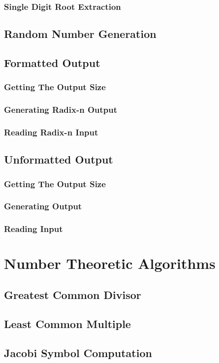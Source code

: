 \documentclass[b5paper]{book}
\begin{document}
\subsection{Single Digit Root Extraction}
\section{Random Number Generation}
\section{Formatted Output}
\subsection{Getting The Output Size}
\subsection{Generating Radix-n Output}
\subsection{Reading Radix-n Input}
\section{Unformatted Output}
\subsection{Getting The Output Size}
\subsection{Generating Output}
\subsection{Reading Input}

\chapter{Number Theoretic Algorithms}
\section{Greatest Common Divisor}
\section{Least Common Multiple}
\section{Jacobi Symbol Computation}
\end{document}
